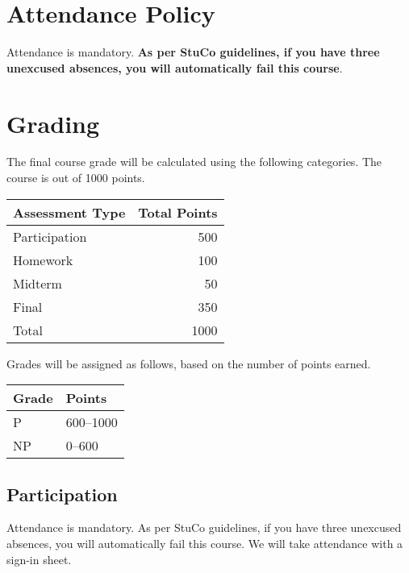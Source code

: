 \documentclass{article}
\begin{document}
\section*{Attendance Policy}

Attendance is mandatory. \textbf{As per StuCo guidelines, if you have three
unexcused absences, you will automatically fail this course}.

\section*{Grading}

The final course grade will be calculated using the following categories. The
course is out of 1000 points.

\begin{center}
    \begin{tabular}{@{}lr@{}}
        Assessment Type     & Total Points \\ \toprule
        Participation       &          500 \\
        Homework            &          100 \\
        Midterm             &           50 \\
        Final               &          350 \\ \midrule
        Total               &         1000 \\ \bottomrule
    \end{tabular}
\end{center}

Grades will be assigned as follows, based on the number of points earned.

\begin{center}
    \begin{tabular}{@{}ll@{}}
        Grade   & Points    \\ \toprule
        P       & 600--1000 \\
        NP      & 0--600    \\ \bottomrule
    \end{tabular}
\end{center}

\subsection*{Participation}

Attendance is mandatory. As per StuCo guidelines, if you have three unexcused
absences, you will automatically fail this course. We will take attendance with
a sign-in sheet.
\end{document}

